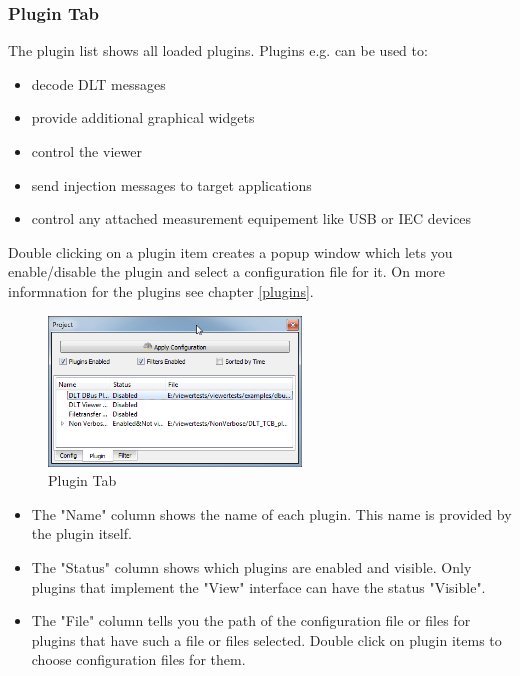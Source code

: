 \documentclass[a4paper,11pt]{article}
\begin{document}
\subsubsection{Plugin Tab}
\label{plugintab}
The plugin list shows all loaded plugins.
Plugins e.g. can be used to:
\begin{itemize}
 \item decode DLT messages
 \item provide additional graphical widgets
 \item control the viewer
 \item send injection messages to target applications
 \item control any attached measurement equipement like USB or IEC devices
\end{itemize}

Double clicking on a plugin item creates a popup window which lets you enable/disable the plugin and select a configuration file for it. On more informnation for the plugins see chapter \autoref{plugins}.

\begin{figure}[H]
 \centering
 \includegraphics[width=0.6\textwidth]{images/plugin_tab.png}
 \caption{Plugin Tab}
 \label{fig:plugintab}
\end{figure}



\begin{itemize}
 \item The "Name" column shows the name of each plugin. This name is provided by the plugin itself.
 \item The "Status" column shows which plugins are enabled and visible. Only plugins that implement the "View" interface can have the status "Visible".
 \item The "File" column tells you the path of the configuration file or files for plugins that have such a file or files selected. Double click on plugin items to choose configuration files for them.
\end{itemize}
\end{document}
